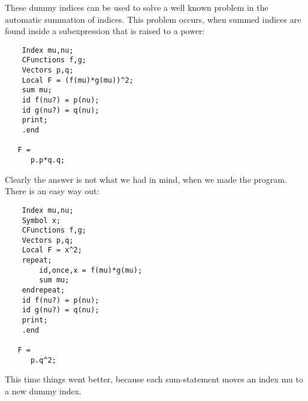 These dummy indices can be used to solve a well known problem in the 
automatic summation of indices. This problem occurs, when summed indices 
are found inside a subexpression that is raised to a power:
\begin{verbatim}
    Index mu,nu;
    CFunctions f,g;
    Vectors p,q;
    Local F = (f(mu)*g(mu))^2;
    sum mu;
    id f(nu?) = p(nu);
    id g(nu?) = q(nu);
    print;
    .end

   F =
      p.p*q.q;
\end{verbatim}
Clearly the answer is not what we had in mind, when we made the program. 
There is an easy way out:
\begin{verbatim}
    Index mu,nu;
    Symbol x;
    CFunctions f,g;
    Vectors p,q;
    Local F = x^2;
    repeat;
        id,once,x = f(mu)*g(mu);
        sum mu;
    endrepeat;
    id f(nu?) = p(nu);
    id g(nu?) = q(nu);
    print;
    .end

   F =
      p.q^2;
\end{verbatim}
This time things went better, because each sum-statement moves an index 
mu to a new dummy index.

